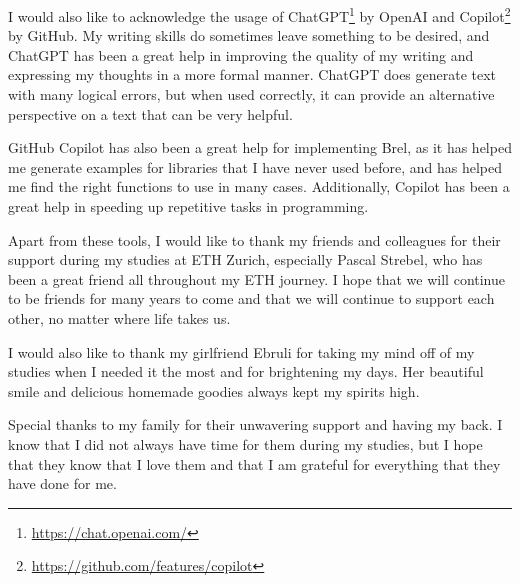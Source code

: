 I would also like to acknowledge the usage of ChatGPT\footnote{\url{https://chat.openai.com/}} by OpenAI 
and Copilot\footnote{\url{https://github.com/features/copilot}} by GitHub.
My writing skills do sometimes leave something to be desired, and ChatGPT has been a great help in improving the quality of my writing and expressing my thoughts in a more formal manner.
ChatGPT does generate text with many logical errors, but when used correctly, it can provide an alternative perspective on a text that can be very helpful. 

GitHub Copilot has also been a great help for implementing Brel, 
as it has helped me generate examples for libraries that I have never used before,
and has helped me find the right functions to use in many cases.
Additionally, Copilot has been a great help in speeding up repetitive tasks in programming.

Apart from these tools, I would like to thank my friends and colleagues for their support during my studies at ETH Zurich,
especially Pascal Strebel, who has been a great friend all throughout my ETH journey.
I hope that we will continue to be friends for many years to come and that we will continue to support each other, no matter where life takes us.

I would also like to thank my girlfriend Ebruli for taking my mind off of my studies when I needed it the most and
for brightening my days. 
Her beautiful smile and delicious homemade goodies always kept my spirits high.

Special thanks to my family for their unwavering support and having my back.
I know that I did not always have time for them during my studies, 
but I hope that they know that I love them and that I am grateful for everything that they have done for me.

